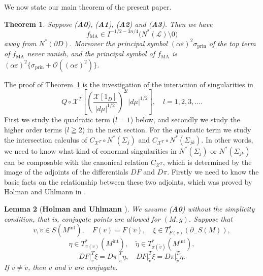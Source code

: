 \documentclass[a4paper,11pt,reqno]{amsart}
\numberwithin{equation}{section}
\newtheorem{theorem}{Theorem}[section]
\newtheorem{lemma}[theorem]{Lemma}
\theoremstyle{definition}
\theoremstyle{remark}
\begin{document}
%
%
\par
%
%
We now state our main theorem of the present paper. 
%
%
\begin{theorem}
\label{theorem:51}
Suppose {\rm ({\bf A0})}, {\rm ({\bf A1})}, 
{\rm ({\bf A2})} and {\rm ({\bf A3})}. 
Then we have
%
%
\begin{equation}
f_\text{MA} 
\in 
I^{-1/2-3n/4}\bigl(N^\ast(\mathcal{L})\setminus0\bigr)
\label{equation:MAIN} 
\end{equation}
%
%
away from $N^\ast(\partial{D})$. 
Moreover the principal symbol $(\alpha\varepsilon)^2\sigma_\text{prin}$ 
of the top term of $f_\text{MA}$ never vanish, 
and the principal symbol of $f_\text{MA}$ is 
$(\alpha\varepsilon)^2\{\sigma_\text{prin}+\mathcal{O}((\alpha\varepsilon)^2)\}$.
\end{theorem}
%
%
%
%
The proof of Theorem~\ref{theorem:51} 
is the investigation of the interaction of singularities in 
%
%
\begin{equation}
 Q\circ\mathcal{X}^T
  \left[
  \left(\frac{\mathcal{X}[1_D]}{\lvert{d\mu}\rvert^{1/2}}\right)^{2l}
  \lvert{d\mu}\rvert^{1/2}
  \right], 
\quad
l=1,2,3,\dotsc. 
\label{equation:singularity}
\end{equation}
%
%
First we study the quadratic term ($l=1$) below, 
and secondly we study the higher order terms ($l\geqq2$) in the next section. 
For the quadratic term we study the intersection calculus of 
$C_{\mathcal{X}^T}{\circ}N^\ast(\Sigma_j)$ and 
$C_{\mathcal{X}^T}{\circ}N^\ast(\Sigma_{jk})$. 
In other words, we need to know what kind of conormal singularities 
in $N^\ast(\Sigma_j)$ or $N^\ast(\Sigma_{jk})$ 
can be composable with the canonical relation $C_{\mathcal{X}^T}$, 
which is determined by the image of the adjoints 
of the differentials $DF$ and $D\pi$.  
Firstly we need to know the basic facts on the relationship between 
these two adjoints, which was proved by Holman and Uhlmann in 
\cite{HolmanUhlmann}. 
%
%
\begin{lemma}[{\bf Holman and Uhlmann \cite[Lemma~5]{HolmanUhlmann}}]
\label{theorem:holmanuhlmann}
We assume {\rm ({\bf A0})} without the simplicity condition, 
that is, conjugate points are allowed for $(M,g)$.  
Suppose that 
$$
v, \tilde{v} \in S(M^\text{int}),
\quad 
F(v)=F(\tilde{v}),
\quad 
\xi \in T^\ast_{F(v)}(\partial_-S(M)),
$$
%
% 
$$
\eta \in T^\ast_{\pi(v)}(M^\text{int}),
\quad 
\tilde{\eta} \in T^\ast_{\pi(\tilde{v})}(M^\text{int}),
$$ 
%
%
$$
DF\vert^T_v\xi=D\pi\vert^T_v\eta,
\quad
DF\vert^T_{\tilde{v}}\xi=D\pi\vert^T_{\tilde{v}}\tilde{\eta}. 
$$
%
%
If $v \ne \tilde{v}$, then $v$ and $\tilde{v}$ are conjugate. 
\end{lemma}
\end{document}
